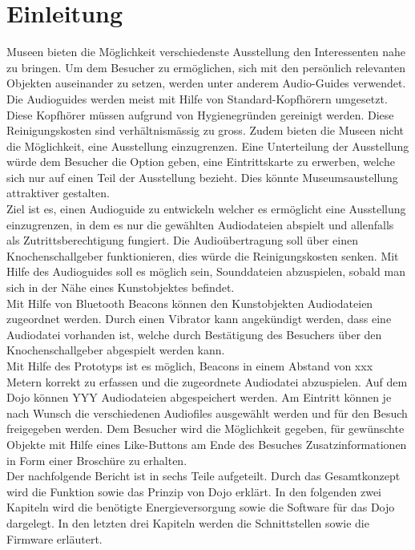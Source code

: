 \chapter{Einleitung}
\thispagestyle{fancy}  \setcounter{page}{1}
Museen bieten die Möglichkeit verschiedenste Ausstellung den Interessenten nahe zu bringen. Um dem Besucher zu ermöglichen, sich mit den persönlich relevanten Objekten auseinander zu setzen, werden unter anderem Audio-Guides verwendet. Die Audioguides werden meist mit Hilfe von Standard-Kopfhörern umgesetzt. Diese Kopfhörer müssen aufgrund von Hygienegründen gereinigt werden. Diese Reinigungskosten sind verhältnismässig zu gross. Zudem bieten die Museen nicht die Möglichkeit, eine Ausstellung einzugrenzen. Eine Unterteilung der Ausstellung würde dem Besucher die Option geben, eine Eintrittskarte zu erwerben, welche sich nur auf einen Teil der Ausstellung bezieht. Dies könnte Museumsaustellung attraktiver gestalten.\\

Ziel ist es, einen Audioguide zu entwickeln welcher es ermöglicht eine Ausstellung einzugrenzen, in dem es nur die gewählten Audiodateien abspielt und allenfalls als Zutrittsberechtigung fungiert. Die Audioübertragung soll über einen Knochenschallgeber funktionieren, dies würde die Reinigungskosten senken. Mit Hilfe des Audioguides soll es möglich sein, Sounddateien abzuspielen, sobald man sich in der Nähe eines Kunstobjektes befindet.\\

Mit Hilfe von Bluetooth Beacons können den Kunstobjekten Audiodateien zugeordnet werden. Durch einen Vibrator kann angekündigt werden, dass eine Audiodatei vorhanden ist, welche durch Bestätigung des Besuchers über den Knochenschallgeber abgespielt werden kann.\\

Mit Hilfe des Prototyps ist es möglich, Beacons in einem Abstand von xxx Metern korrekt zu erfassen und die zugeordnete Audiodatei abzuspielen. Auf dem Dojo können YYY Audiodateien abgespeichert werden. Am Eintritt können je nach Wunsch die verschiedenen Audiofiles ausgewählt werden und für den Besuch freigegeben werden. Dem Besucher wird die Möglichkeit gegeben, für gewünschte Objekte mit Hilfe eines Like-Buttons am Ende des Besuches Zusatzinformationen in Form einer Broschüre zu erhalten.\\

Der nachfolgende Bericht ist in sechs Teile aufgeteilt. Durch das Gesamtkonzept wird die Funktion sowie das Prinzip von Dojo erklärt. In den folgenden zwei Kapiteln wird die benötigte Energieversorgung sowie die Software für das Dojo dargelegt. In den letzten drei Kapiteln werden die Schnittstellen sowie die Firmware erläutert. 